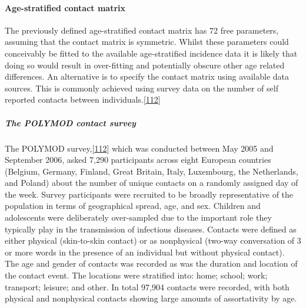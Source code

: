 \documentclass[11pt,twoside]{bristolthesis}
\begin{document}
  \hypertarget{contact-matrix}{%
  \paragraph{Age-stratified contact matrix}\label{contact-matrix}}
  
  The previously defined age-stratified contact matrix has 72 free parameters, assuming that the contact matrix is symmetric. Whilst these parameters could conceivably be fitted to the available age-stratified incidence data it is likely that doing so would result in over-fitting and potentially obscure other age related differences. An alternative is to specify the contact matrix using available data sources. This is commonly achieved using survey data on the number of self reported contacts between individuals.{[}\protect\hyperlink{ref-Mossong2008}{112}{]}
  
  \hypertarget{the-polymod-contact-survey}{%
  \subparagraph{The POLYMOD contact survey}\label{the-polymod-contact-survey}}
  
  The POLYMOD survey,{[}\protect\hyperlink{ref-Mossong2008}{112}{]} which was conducted between May 2005 and September 2006, asked 7,290 participants across eight European countries (Belgium, Germany, Finland, Great Britain, Italy, Luxembourg, the Netherlands, and Poland) about the number of unique contacts on a randomly assigned day of the week. Survey participants were recruited to be broadly representative of the population in terms of geographical spread, age, and sex. Children and adolescents were deliberately over-sampled due to the important role they typically play in the transmission of infectious diseases. Contacts were defined as either physical (skin-to-skin contact) or as nonphysical (two-way conversation of 3 or more words in the presence of an individual but without physical contact). The age and gender of contacts was recorded as was the duration and location of the contact event. The locations were stratified into: home; school; work; transport; leisure; and other. In total 97,904 contacts were recorded, with both physical and nonphysical contacts showing large amounts of assortativity by age.
  
\end{document}
